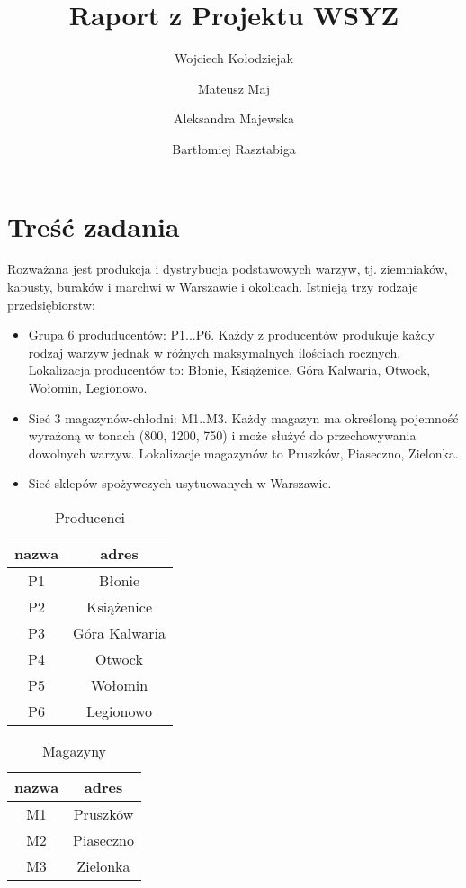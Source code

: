 \documentclass{article}
\title{Raport z Projektu WSYZ}
\author{
  Wojciech Kołodziejak\\
  \and
  Mateusz Maj\\
  \and
  Aleksandra Majewska\\
  \and
  Bartłomiej Rasztabiga
}
\begin{document}
\maketitle

\section{Treść zadania}

Rozważana jest produkcja i dystrybucja podstawowych warzyw, tj. ziemniaków, kapusty, buraków i marchwi w Warszawie i okolicach.
Istnieją trzy rodzaje przedsiębiorstw:
\begin{itemize}
  \item Grupa 6 produducentów: P1...P6. Każdy z producentów produkuje każdy rodzaj warzyw jednak w różnych maksymalnych ilościach rocznych. Lokalizacja producentów to: Błonie, Książenice, Góra Kalwaria, Otwock, Wołomin, Legionowo.
  \item Sieć 3 magazynów-chłodni: M1..M3. Każdy magazyn ma określoną pojemność wyrażoną w tonach (800, 1200, 750) i może służyć do przechowywania dowolnych warzyw. Lokalizacje magazynów to Pruszków, Piaseczno, Zielonka.
  \item Sieć sklepów spożywczych usytuowanych w Warszawie.
\end{itemize}

\begin{center}
\begin{longtable}{|c c|} 
\caption{Producenci} \\
\hline
nazwa & adres \\
\hline \hline
P1 & Błonie \\
\hline P2 & Książenice \\
\hline P3 & Góra Kalwaria \\
\hline P4 & Otwock \\
\hline P5 & Wołomin \\
\hline P6 & Legionowo \\
\hline
\end{longtable}
\end{center}

\begin{center}
\begin{longtable}{|c c|} 
\caption{Magazyny} \\
\hline
nazwa & adres \\
\hline \hline
M1 & Pruszków \\
\hline M2 & Piaseczno \\
\hline M3 & Zielonka \\
\hline
\end{longtable}
\end{center}
\end{document}
